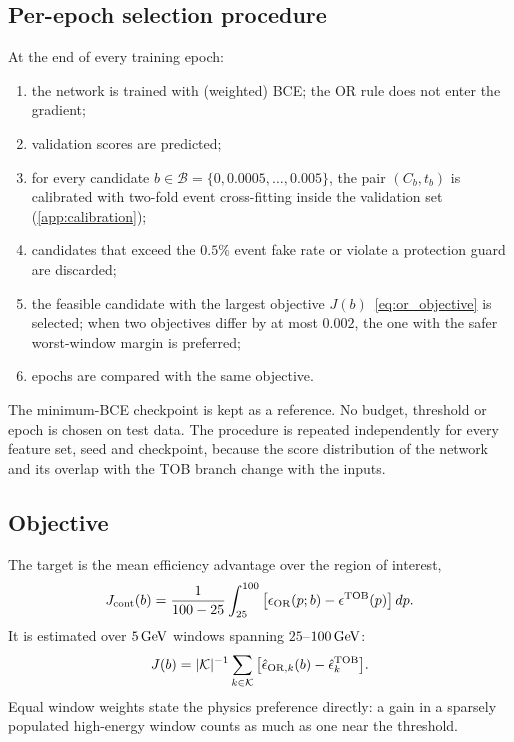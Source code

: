 \subsection{Per-epoch selection procedure}
At the end of every training epoch:
\begin{enumerate}
  \item the network is trained with (weighted) BCE; the OR rule does not enter the gradient;
  \item validation scores are predicted;
  \item for every candidate $b\in\mathcal{B}=\{0,0.0005,\dots,0.005\}$, the pair $(C_b,t_b)$ is calibrated with two-fold event cross-fitting inside the validation set (\cref{app:calibration});
  \item candidates that exceed the $0.5\%$ event fake rate or violate a protection guard are discarded;
  \item the feasible candidate with the largest objective $J(b)$~\eqref{eq:or_objective} is selected; when two objectives differ by at most $0.002$, the one with the safer worst-window margin is preferred;
  \item epochs are compared with the same objective.
\end{enumerate}
The minimum-BCE checkpoint is kept as a reference. No budget, threshold or epoch is chosen on test data. The procedure is repeated independently for every feature set, seed and checkpoint, because the score distribution of the network and its overlap with the TOB branch change with the inputs.

\subsection{Objective}
The target is the mean efficiency advantage over the region of interest,
\begin{equation}
  J_{\mathrm{cont}}(b)=\frac{1}{100-25}\int_{25}^{100}\big[\epsilon_{\mathrm{OR}}(p;b)-\epsilon^{\mathrm{TOB}}(p)\big]\,dp .
\end{equation}
It is estimated over $5\,\mathrm{GeV}$ windows spanning $25$--$100\,\mathrm{GeV}$:
\begin{equation}
  J(b)=|\mathcal{K}|^{-1}\sum_{k\in\mathcal{K}}\big[\hat{\epsilon}_{\mathrm{OR},k}(b)-\hat{\epsilon}^{\mathrm{TOB}}_k\big].
  \label{eq:or_objective}
\end{equation} Equal window weights state the physics preference directly: a gain in a sparsely populated high-energy window counts as much as one near the threshold.

